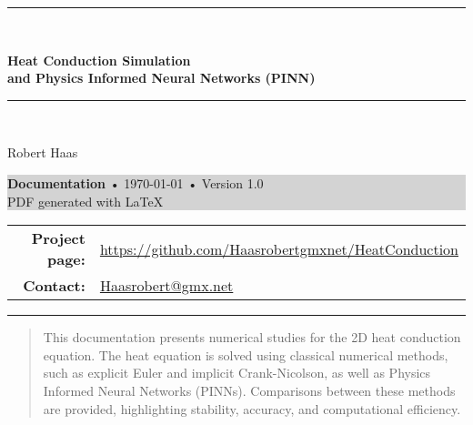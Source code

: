 \documentclass[a4paper,11pt]{article}
\begin{document}
\begin{titlepage}
    \centering

    \vspace*{1cm}
    {\color{mainblue} \rule{1.0\textwidth}{2pt}}\\[0.5cm]

    {\Huge\bfseries Heat Conduction Simulation\\[0.3em]
    and Physics Informed Neural Networks (PINN)\par}
    
    \vspace*{0.5cm}
    {\color{mainblue} \rule{1.0\textwidth}{2pt}}\\[1.5cm]
    
    \vspace{1cm}

    {\Large Robert Haas}\\[0.3em]

    \vspace{4cm}
    \colorbox{lightgray}{
        \parbox{0.8\textwidth}{
            \vspace{1em}
            \centering
            {\normalsize\textbf{Documentation} • \today{ }• Version 1.0}\\[0.5em]
            {\small PDF generated with \LaTeX}
            \vspace{1em}
        }
    }

    \vfill

    {\footnotesize
    \begin{tabular}{rl}
    \textbf{Project page:} & \href{https://github.com/Haasrobertgmxnet/HeatConduction}{https://github.com/Haasrobertgmxnet/HeatConduction}\\
    \textbf{Contact:} & \href{mailto:Haasrobert@gmx.net}{Haasrobert@gmx.net} \\
    \end{tabular}
    }

    \vspace{2cm}
    {\color{mainblue} \rule{1.0\textwidth}{2pt}}  %
\end{titlepage}

\pagestyle{main}

\begin{abstract}
This documentation presents numerical studies for the 2D heat conduction equation. The heat equation is solved using classical numerical methods, such as explicit Euler and implicit Crank-Nicolson, as well as Physics Informed Neural Networks (PINNs). Comparisons between these methods are provided, highlighting stability, accuracy, and computational efficiency.
\end{abstract}
\end{document}
